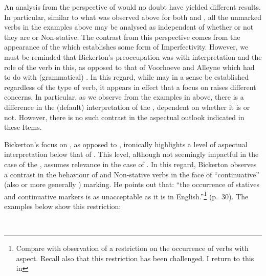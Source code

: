 An analysis from the perspective of  would no doubt
have yielded different results.  In particular, similar to what was
observed above for both \citet{Voorhoeve1957} and \citet{Alleyne1980},
all the unmarked verbs in the examples above  may be analysed as
 independent of whether or not they are  or
Non-stative.  The contrast from this perspective comes from the
appearance of the   which establishes some
form of Imperfectivity.  However, we must be reminded that Bickerton’s
preoccupation was with  interpretation and the role of the verb
in this, as opposed to that of Voorhoeve and Alleyne which had to do
with (grammatical) .  In this regard, while
 may in a sense be established regardless of the
type of verb, it appears in effect that a focus on  raises
different concerns.  In particular, as we observe from the examples in
 above, there is a difference in the (default) 
interpretation of the , dependent on whether it is
 or not.  However, there is no such contrast in the aspectual
outlook indicated in these Items.

Bickerton’s focus on , as opposed to , ironically
highlights a level of aspectual interpretation below that of
.  This level, although not seemingly impactful in
the case of the , assumes relevance in the case of
 .  In this regard, Bickerton observes a
contrast in the behaviour of  and Non-stative verbs in the face
of “continuative” (also  or more generally )
marking.  He points out that: ``the occurrence of statives and
continuative markers is as unacceptable as it is in
English.”\footnote{Compare with  observation of
  a restriction on the occurrence of  verbs with 
  aspect. Recall also that this restriction has been challenged. I
  return to this in } (p.~30).  The examples below show
this restriction:

\ea%
\label{ex:2:7}
\citet[30]{Bickerton1975} \\

